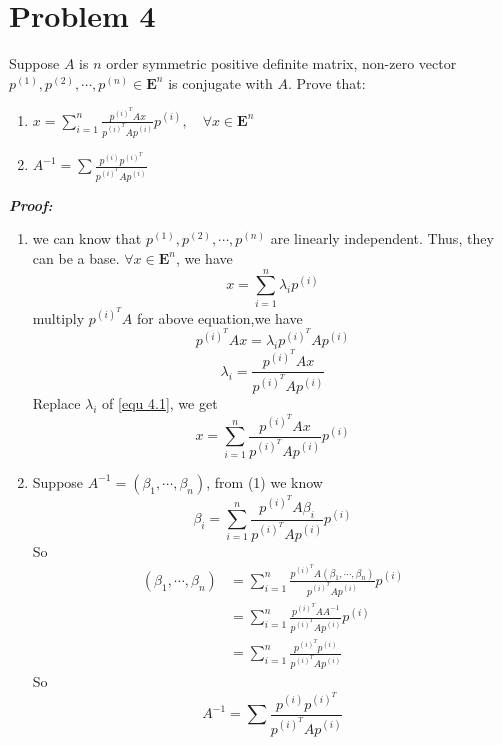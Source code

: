 \documentclass[paper=a4, fontsize=11pt]{scrartcl} %
\numberwithin{equation}{section} %
\numberwithin{figure}{section} %
\numberwithin{table}{section} %
\begin{document}
\section{Problem 4}
Suppose $A$ is $n$ order symmetric positive definite matrix, non-zero vector $p^{(1)}, p^{(2)},\cdots, p^{(n)} \in \mathbf{E}^n$ is conjugate with $A$. Prove that:
\begin{enumerate}
\item $x = \sum_{i=1}^{n}\frac{p^{{(i)}^T}Ax}{p^{{(i)}^T}Ap^{(i)}}p^{(i)}, \quad \forall x \in \mathbf{E}^n$
\item $A^{-1} = \sum \frac{p^{(i)} p^{{(i)}^T}}{p^{{(i)}^T}Ap^{(i)}}$
\end{enumerate}
\emph{\textbf{Proof:}}\\
\begin{enumerate}
\item 
we can know that $p^{(1)}, p^{(2)},\cdots, p^{(n)}$ are linearly independent. Thus, they can be a base. $\forall x \in  \mathbf{E}^n$, we have
\begin{equation}
\label{equ 4.1}
x = \sum_{i=1}^n \lambda_ip^{(i)}
\end{equation}
multiply $p^{(i)^T}A$ for above equation,we have
\begin{equation}\nonumber
p^{(i)^T}Ax = \lambda_i p^{(i)^T}Ap^{(i)}
\end{equation}
\begin{equation}\nonumber
\lambda_i= \frac{p^{(i)^T}Ax}{p^{(i)^T}Ap^{(i)}}
\end{equation}
Replace $\lambda_i$ of \ref{equ 4.1}, we get
\begin{equation}\nonumber
x = \sum_{i=1}^{n}\frac{p^{{(i)}^T}Ax}{p^{{(i)}^T}Ap^{(i)}}p^{(i)}
\end{equation}

\item 
Suppose $A^{-1}=\left(\beta_1,\cdots,\beta_n\right)$, from (1) we know
\begin{equation}\nonumber
\beta_i = \sum_{i=1}^{n}\frac{p^{{(i)}^T}A\beta_i}{p^{{(i)}^T}Ap^{(i)}}p^{(i)}
\end{equation}
So
\begin{align*}\nonumber
\left(\beta_1,\cdots,\beta_n\right)& = \sum_{i=1}^{n}\frac{p^{{(i)}^T}A\left(\beta_1,\cdots,\beta_n\right)}{p^{{(i)}^T}Ap^{(i)}}p^{(i)}\\
&=\sum_{i=1}^{n}\frac{p^{{(i)}^T}AA^{-1}}{p^{{(i)}^T}Ap^{(i)}}p^{(i)}\\
&=\sum_{i=1}^{n}\frac{p^{{(i)}^T}p^{(i)}}{p^{{(i)}^T}Ap^{(i)}}
\end{align*}
So
\begin{equation}\nonumber
A^{-1} = \sum \frac{p^{(i)} p^{{(i)}^T}}{p^{{(i)}^T}Ap^{(i)}}
\end{equation}

\end{enumerate}
\end{document}
